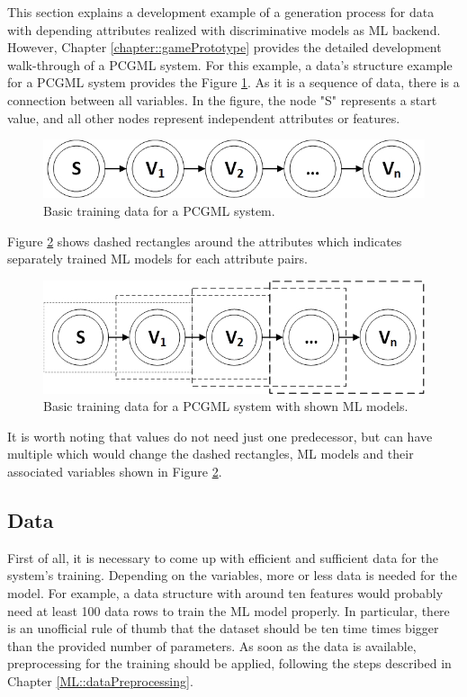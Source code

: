 \documentclass[MGS,Master,english]{twbook}%
\begin{document}
This section explains a development example of a generation process for data with depending attributes realized with discriminative models as \ac{ML} backend. However, Chapter \ref{chapter::gamePrototype} provides the detailed development walk-through of a \ac{PCGML} system. For this example, a data’s structure example for a \ac{PCGML} system provides the Figure \ref{fig::PCGML::devExample::sequenceBase}. As it is a sequence of data, there is a connection between all variables. In the figure, the node "S" represents a start value, and all other nodes represent independent attributes or features. 
\begin{figure}[!htbp]
	\centering
	\includegraphics[width=0.5\linewidth]{PICs/PCGML_development_example_sequence_base}
	\caption{Basic training data for a \ac{PCGML} system. }\label{fig::PCGML::devExample::sequenceBase}
\end{figure}
Figure \ref{fig::PCGML::devExample::sequenceWithModels} shows dashed rectangles around the attributes which indicates separately trained \ac{ML} models for each attribute pairs. 
\begin{figure}[!htbp]
	\centering
	\includegraphics[width=0.55\linewidth]{PICs/PCGML_development_example_sequence_with_models}
	\caption{Basic training data for a \ac{PCGML} system with shown \ac{ML} models.}\label{fig::PCGML::devExample::sequenceWithModels}
\end{figure}
It is worth noting that values do not need just one predecessor, but can have multiple which would change the dashed rectangles, \ac{ML} models and their associated variables shown in Figure \ref{fig::PCGML::devExample::sequenceWithModels}.

\subsection{Data}
First of all, it is necessary to come up with efficient and sufficient data for the system’s training. Depending on the variables, more or less data is needed for the model. For example, a data structure with around ten features would probably need at least 100 data rows to train the \ac{ML} model properly. In particular, there is an unofficial rule of thumb that the dataset should be ten time times bigger than the provided number of parameters. As soon as the data is available, preprocessing for the training should be applied, following the steps described in Chapter \ref{ML::dataPreprocessing}.
\end{document}
